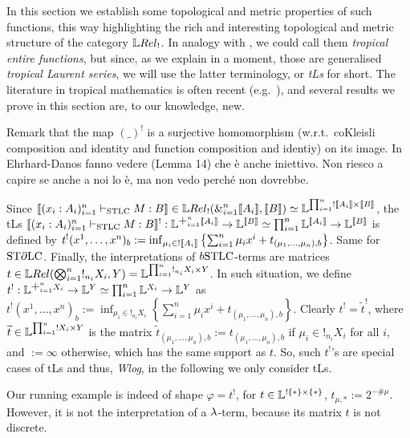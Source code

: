 
In this section we establish some topological and metric properties of such functions, this way highlighting the rich and interesting topological and metric structure of the category $\LREL_{!}$.
In analogy with \cite{DanEhrh2011}, we could call them \emph{tropical entire functions}, but since, as we explain in a moment, those are generalised \emph{tropical Laurent series}, we will use the latter terminology, or \emph{tLs} for short.
The literature in tropical mathematics is often recent (e.g.~\cite{Porzio2021}), and several results we prove in this section are, to our knowledge, new.

Remark that the map $(\_)^!$ is a surjective homomorphism (w.r.t.\ coKleisli composition and identity and function composition and identiy) on its image. {\color{red}In Ehrhard-Danos fanno vedere (Lemma 14) che \`e anche iniettivo. Non riesco a capire se anche a noi lo \`e, ma non vedo perch\'e non dovrebbe.}

\begin{remark}
 Since $\model{(x_i:A_i)_{i=1}^n\vdash_{\STLC} M:B}\in\HOM{\LREL_!}{\mathlarger{\&}_{i=1}^n \model{A_i}}{\model B}\simeq\Lawv^{\prod_{i=1}^n ! \model {A_i}\times \model B}$, the tLs $\model{(x_i:A_i)_{i=1}^n\vdash_{\STLC} M:B}^!:\Lawv^{\mathlarger{+}_{i=1}^n \model{A_i}}\to\Lawv^{\model B} \simeq \prod_{i=1}^n\Lawv^{\model{A_i}}\to\Lawv^{\model B}$ is defined by $t^!(x^1,\dots,x^n)_b:=\inf_{\mu_i\in ! \llbracket A_i\rrbracket}\left\{\sum_{i=1}^n\mu_i x^i+t_{(\mu_1,\dots,\mu_n),b}\right\}$.
Same for $\mathrm{ST}\partial\mathrm{LC}$.
Finally, the interpretations of $\BSTLC$-terms are matrices $t\in\HOM{\LREL}{\bigotimes_{i=1}^n !_{n_i}X_i}{Y}=\Lawv^{\prod_{i=1}^n !_{n_i}X_i\times Y}$.
In such situation, we define $t^!:\Lawv^{\mathlarger{+}_{i=1}^n X_{i}}\to\Lawv^Y \simeq \prod_{i=1}^n\Lawv^{X_{i}}\to\Lawv^Y$ as $t^!(x^1,\dots,x^n)_b:=\inf_{\mu_i\in !_{n_i} X_i}\left\{\sum_{i=1}^n\mu_i x^i+t_{(\mu_1,\dots,\mu_n),b}\right\}$.
Clearly $t^!={\widetilde t}^!$, where $\widetilde t\in\mathbb{L}^{\prod_{i=1}^n ! {X_i}\times Y}$ is the matrix $\widetilde t_{(\mu_1,\dots,\mu_n),b}:=t_{(\mu_1,\dots,\mu_n),b}$ if $\mu_i\in !_{n_i} X_i$ for all $i$, and $:=\infty$ otherwise, which has the same support as $t$.
So, such $t^!$'s are special cases of tLs and thus, \emph{Wlog}, in the following we only consider tLs.
\end{remark}

%


 \begin{remark}
 Our running example is indeed of shape $\varphi=t^!$, for $t\in\mathbb{L}^{!\{*\}\times\{*\}}$, $t_{\mu,*}:=2^{-\# \mu}$.
 However, it is not the interpretation of a $\lambda$-term, because its matrix $t$ is not discrete.
\end{remark}

